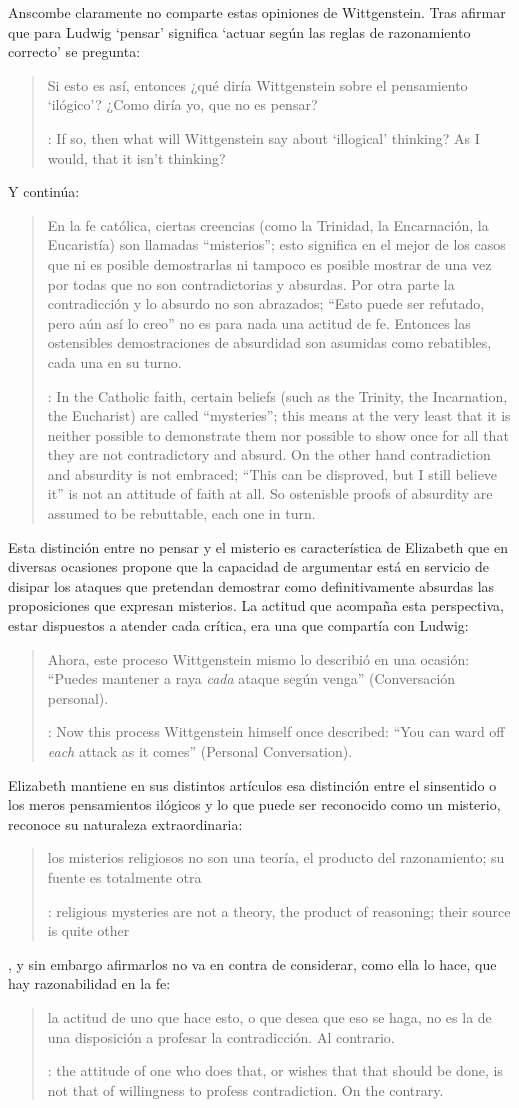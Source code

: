Anscombe claramente no comparte estas opiniones de Wittgenstein. Tras afirmar que para Ludwig `pensar' significa \enquote*{actuar según las reglas de razonamiento correcto} se pregunta: \blockquote[{\cite[122]{anscombe1981parmenides:qli}}: If so, then what will Wittgenstein say about `illogical' thinking? As I would, that it isn't thinking?]{Si esto es así, entonces ¿qué diría Wittgenstein sobre el pensamiento `ilógico'? ¿Como diría yo, que no es pensar?} Y continúa: \blockquote[{\cite[122]{anscombe1981parmenides:qli}}: In the Catholic faith, certain beliefs (such as the Trinity, the Incarnation, the Eucharist) are called ``mysteries''; this means at the very least that it is neither possible to demonstrate them nor possible to show once for all that they are not contradictory and absurd. On the other hand contradiction and absurdity is not embraced; ``This can be disproved, but I still believe it'' is not an attitude of faith at all. So ostenisble proofs of absurdity are assumed to be rebuttable, each one in turn.]{En la fe católica, ciertas creencias (como la Trinidad, la Encarnación, la Eucaristía) son llamadas ``misterios''; esto significa en el mejor de los casos que ni es posible demostrarlas ni tampoco es posible mostrar de una vez por todas que no son contradictorias y absurdas. Por otra parte la contradicción y lo absurdo no son abrazados; ``Esto puede ser refutado, pero aún así lo creo'' no es para nada una actitud de fe. Entonces las ostensibles demostraciones de absurdidad son asumidas como rebatibles, cada una en su turno.} Esta distinción entre no pensar y el misterio es característica de Elizabeth que en diversas ocasiones propone que la capacidad de argumentar está en servicio de disipar los ataques que pretendan demostrar como definitivamente absurdas las proposiciones que expresan misterios. La actitud que acompaña esta perspectiva, estar dispuestos a atender cada crítica, era una que compartía con Ludwig: \blockquote[{\cite[122]{anscombe1981parmenides:qli}}: Now this process Wittgenstein himself once described: ``You can ward off \emph{each} attack as it comes'' (Personal Conversation).]{Ahora, este proceso Wittgenstein mismo lo describió en una ocasión: ``Puedes mantener a raya \emph{cada} ataque según venga'' (Conversación personal).}

Elizabeth mantiene en sus distintos artículos esa distinción entre el sinsentido o los meros pensamientos ilógicos y lo que puede ser reconocido como un misterio, reconoce su naturaleza extraordinaria: \blockquote[{\cite[122--123]{anscombe1981parmenides:qli}}: religious mysteries are not a theory, the product of reasoning; their source is quite other]{los misterios religiosos no son una teoría, el producto del razonamiento; su fuente es totalmente otra}, y sin embargo afirmarlos no va en contra de considerar, como ella lo hace, que hay razonabilidad en la fe: \blockquote[{\cite[122]{anscombe1981parmenides:qli}}: the attitude of one who does that, or wishes that that should be done, is not that of willingness to profess contradiction. On the contrary.]{la actitud de uno que hace esto, o que desea que eso se haga, no es la de una disposición a profesar la contradicción. Al contrario.}
